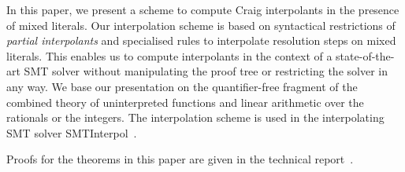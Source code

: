 
In this paper, we present a scheme to compute Craig interpolants in the
presence of mixed literals.  Our interpolation scheme is based on
syntactical restrictions of \emph{partial interpolants} and specialised rules to
interpolate resolution steps on mixed literals. 
This enables us to compute interpolants in the context of a state-of-the-art SMT
solver without manipulating the proof tree or restricting the solver in any
way.
We base our presentation
on the quantifier-free fragment of the combined theory of uninterpreted
functions and linear arithmetic over the rationals or the integers.
The interpolation scheme is used in the interpolating SMT solver
SMTInterpol~\cite{toolpaper}.  
\begin{tacas}
Proofs for the theorems in this paper are
given in the technical report~\cite{atr}.
\end{tacas}

